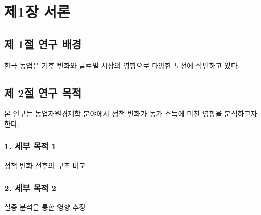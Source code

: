 
\chapter{제1장 서론}



\section{제 1절 연구 배경}
한국 농업은 기후 변화와 글로벌 시장의 영향으로 다양한 도전에 직면하고 있다.

\section{제 2절 연구 목적}
본 연구는 농업자원경제학 분야에서 정책 변화가 농가 소득에 미친 영향을 분석하고자 한다.

\subsection{1. 세부 목적 1}
정책 변화 전후의 구조 비교

\subsection{2. 세부 목적 2}
실증 분석을 통한 영향 추정